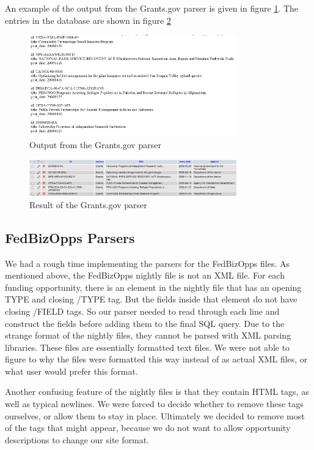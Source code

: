 \documentclass[onecolumn]{IEEEtran}
\begin{document}
An example of the output from the Grants.gov parser is given in figure \ref{fig:grants_output}. The entries in the database are shown in figure \ref{fig:grants_db}

\begin{figure}
    \centering
    \includegraphics[width=0.8\textwidth]{senior_design_grants_output.png}
    \caption{Output from the Grants.gov parser}
    \label{fig:grants_output}
\end{figure}

\begin{figure}
    \centering
    \includegraphics[width=0.8\textwidth]{senior_design_grants_db.png}
    \caption{Result of the Grants.gov parser}
    \label{fig:grants_db}
\end{figure}

\subsection{FedBizOpps Parsers}
We had a rough time implementing the parsers for the FedBizOpps files. As mentioned above, the FedBizOpps nightly file is not an XML file. For each funding opportunity, there is an element in the nightly file that has an opening TYPE and closing /TYPE tag. But the fields inside that element do not have closing /FIELD tags. So our parser needed to read through each line and construct the fields before adding them to the final SQL query. Due to the strange format of the nightly files, they cannot be parsed with XML parsing libraries. These files are essentially formatted text files. We were not able to figure to why the files were formatted this way instead of as actual XML files, or what user would prefer this format.  

Another confusing feature of the nightly files is that they contain HTML tags, as well as typical newlines. We were forced to decide whether to remove these tags ourselves, or allow them to stay in place. Ultimately we decided to remove most of the tags that might appear, because we do not want to allow opportunity descriptions to change our site format. 
\end{document}
